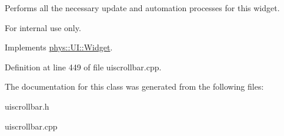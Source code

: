 Performs all the necessary update and automation processes for this widget. 

\begin{DoxyInternal}{For internal use only.}
\end{DoxyInternal}


Implements \hyperlink{classphys_1_1UI_1_1Widget_a1806425fcd684c2f0d50cd0ef4a6b0da}{phys::UI::Widget}.



Definition at line 449 of file uiscrollbar.cpp.



The documentation for this class was generated from the following files:\begin{DoxyCompactItemize}
\item 
uiscrollbar.h\item 
uiscrollbar.cpp\end{DoxyCompactItemize}
